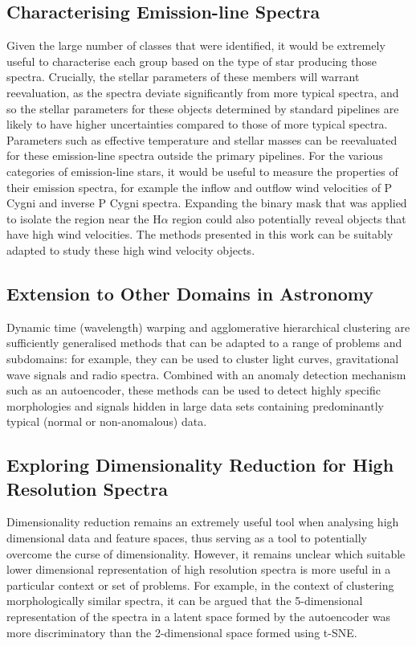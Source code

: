 \subsection{Characterising Emission-line Spectra}

Given the large number of classes that were identified, it would be extremely useful to characterise each group based on the type of star producing those spectra. Crucially, the stellar parameters of these members will warrant reevaluation, as the spectra deviate significantly from more typical spectra, and so the stellar parameters for these objects determined by standard pipelines are likely to have higher uncertainties compared to those of more typical spectra. Parameters such as effective temperature and stellar masses can be reevaluated for these emission-line spectra outside the primary pipelines. For the various categories of emission-line stars, it would be useful to measure  the properties of their emission spectra, for example the inflow and outflow wind velocities of P Cygni and inverse P Cygni spectra. Expanding the binary mask that was applied to isolate the region near the H$\alpha$ region could also potentially reveal objects that have high wind velocities. The methods presented in this work can be suitably adapted to study these high wind velocity objects.

\subsection{Extension to Other Domains in Astronomy}

Dynamic time (wavelength) warping and agglomerative hierarchical clustering are sufficiently generalised methods that can be adapted to a range of problems and subdomains: for example, they can be used to cluster light curves, gravitational wave signals and radio spectra. Combined with an anomaly detection mechanism such as an autoencoder, these methods can be used to detect highly specific morphologies and signals hidden in large data sets containing predominantly typical (normal or non-anomalous) data. 

\subsection{Exploring Dimensionality Reduction for High Resolution Spectra}

Dimensionality reduction remains an extremely useful tool when analysing high dimensional data and feature spaces, thus serving as a tool to potentially overcome the curse of dimensionality. However, it remains unclear which suitable lower dimensional representation of high resolution spectra is more useful in a particular context or set of problems. For example, in the context of clustering morphologically similar spectra, it can be argued that the 5-dimensional representation of the spectra in a latent space formed by the autoencoder was more discriminatory than the 2-dimensional space formed using t-SNE. 


